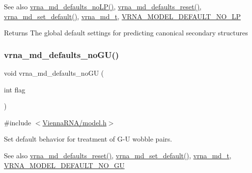 \begin{DoxySeeAlso}{See also}
\hyperlink{group__model__details_ga2f88ffc393ac9d7987849c965fd29ea8}{vrna\+\_\+md\+\_\+defaults\+\_\+no\+L\+P()}, \hyperlink{group__model__details_ga70834424cf804d149937de89f80ceb45}{vrna\+\_\+md\+\_\+defaults\+\_\+reset()}, \hyperlink{group__model__details_ga8ac6ff84936282436f822644bf841f66}{vrna\+\_\+md\+\_\+set\+\_\+default()}, \hyperlink{group__model__details_ga1f8a10e12a0a1915f2a4eff0b28ea17c}{vrna\+\_\+md\+\_\+t}, \hyperlink{group__model__details_gab72462726dd60ed0d43339bbf7ee08ad}{V\+R\+N\+A\+\_\+\+M\+O\+D\+E\+L\+\_\+\+D\+E\+F\+A\+U\+L\+T\+\_\+\+N\+O\+\_\+\+LP} 
\end{DoxySeeAlso}
\begin{DoxyReturn}{Returns}
The global default settings for predicting canonical secondary structures 
\end{DoxyReturn}
\mbox{\label{group__model__details_ga98218f85c7a957a1d1ddf4627fdf5a39}} 
\subsubsection{\texorpdfstring{vrna\+\_\+md\+\_\+defaults\+\_\+no\+G\+U()}{vrna\_md\_defaults\_noGU()}}
{\footnotesize\ttfamily void vrna\+\_\+md\+\_\+defaults\+\_\+no\+GU (\begin{DoxyParamCaption}\item[{int}]{flag }\end{DoxyParamCaption})}



{\ttfamily \#include $<$\hyperlink{model_8h}{Vienna\+R\+N\+A/model.\+h}$>$}



Set default behavior for treatment of G-\/U wobble pairs. 

\begin{DoxySeeAlso}{See also}
\hyperlink{group__model__details_ga70834424cf804d149937de89f80ceb45}{vrna\+\_\+md\+\_\+defaults\+\_\+reset()}, \hyperlink{group__model__details_ga8ac6ff84936282436f822644bf841f66}{vrna\+\_\+md\+\_\+set\+\_\+default()}, \hyperlink{group__model__details_ga1f8a10e12a0a1915f2a4eff0b28ea17c}{vrna\+\_\+md\+\_\+t}, \hyperlink{group__model__details_ga34702f7d14d38b877ba8e475281e97e2}{V\+R\+N\+A\+\_\+\+M\+O\+D\+E\+L\+\_\+\+D\+E\+F\+A\+U\+L\+T\+\_\+\+N\+O\+\_\+\+GU} 
\end{DoxySeeAlso}

